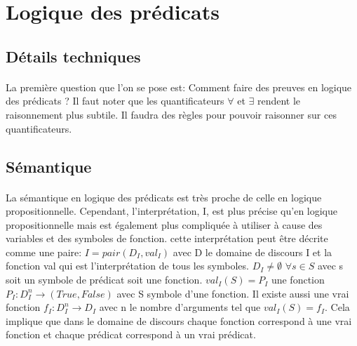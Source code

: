 % 
% 
% 
% 

\chapter{Logique des prédicats}
\section{Détails techniques}
\subsubsection{}
La première question que l'on se pose est: Comment faire des preuves en logique des prédicats ? Il faut noter que les quantificateurs $\forall$ et $\exists$ rendent le raisonnement plus subtile. Il faudra des règles pour pouvoir raisonner sur ces quantificateurs.
\section{Sémantique}
\subsubsection{}
La sémantique en logique des prédicats est très proche de celle en logique propositionnelle. Cependant, l'interprétation, I, est plus précise qu'en logique propositionnelle mais est également plus compliquée à utiliser à cause des variables et des symboles de fonction. cette interprétation peut être décrite comme une paire: $I = pair(D_{I}, val_{I}) $ avec D le domaine de discours I et la fonction val qui est l'interprétation de tous les symboles. $D_{I} \ne \emptyset $ $ \forall s \in S$ avec s soit un symbole de prédicat soit une fonction. $val_{I}(S) = P_{I}$ une fonction $P_{I}:D_{I}^{n} \rightarrow (True,False)$ avec S symbole d'une fonction. Il existe aussi une vrai fonction $f_{I}:D_{I}^{n} \rightarrow D_{I}$ avec n le nombre d'arguments tel que $val_{I}(S) = f_{I} $. Cela implique que dans le domaine de discours chaque fonction correspond à une vrai fonction et chaque prédicat correspond à un vrai prédicat. 
